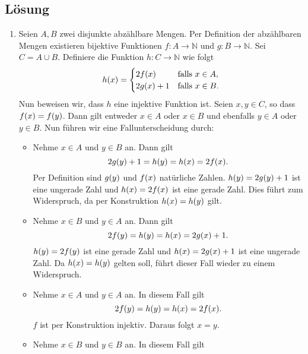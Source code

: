 \documentclass[german,12pt]{homework}
\newcommand{\NN}{\mathbb{N}}
\DeclarePairedDelimiter{\enbrace}{(}{)}
\begin{document}
    \subsection*{Lösung}
    \begin{enumerate}
        \item Seien \(A, B\) zwei disjunkte abzählbare Mengen. Per Definition
        der abzählbaren Mengen existieren bijektive Funktionen \(f: A \to \NN\)
        und \(g: B \to \NN\). Sei \(C = A \cup B\). Definiere die Funktion \(h:
        C \to \NN\) wie folgt
        \[h\enbrace*{x} = \begin{cases}
            2f\enbrace*{x} & \text{falls }x \in A,\\
            2g\enbrace*{x} + 1 & \text{falls }x \in B.
        \end{cases}\]
        Nun beweisen wir, dass \(h\) eine injektive Funktion ist. Seien \(x, y
        \in C\), so dass \(f\enbrace*{x} = f\enbrace*{y}\). Dann gilt entweder
        \(x \in A\) oder \(x \in B\) und ebenfalls \(y \in A\) oder \(y \in
        B\). Nun führen wir eine Fallunterscheidung durch:
        \begin{itemize}
            \item Nehme \(x \in A\) und \(y \in B\) an. Dann gilt
            \[2g\enbrace*{y} + 1 = h\enbrace*{y} = h\enbrace*{x} =
            2f\enbrace*{x}.\]
            Per Definition sind \(g\enbrace*{y}\) und \(f\enbrace*{x}\)
            natürliche Zahlen. \(h\enbrace*{y} = 2g\enbrace*{y} + 1\) ist eine
            ungerade Zahl und \(h\enbrace*{x} = 2f\enbrace*{x}\) ist eine
            gerade Zahl. Dies führt zum Widerspruch, da per Konstruktion
            \(h\enbrace*{x} = h\enbrace*{y}\) gilt.
            \item Nehme \(x \in B\) und \(y \in A\) an. Dann gilt
            \[2f\enbrace*{y} = h\enbrace*{y} = h\enbrace*{x} = 2g\enbrace*{x} +
            1.\]
            \(h\enbrace*{y} = 2f\enbrace*{y}\) ist eine gerade Zahl und
            \(h\enbrace*{x} = 2g\enbrace*{x} + 1\) ist eine ungerade Zahl. Da
            \(h\enbrace*{x} = h\enbrace*{y}\) gelten soll, führt dieser Fall
            wieder zu einem Widerspruch.
            \item Nehme \(x \in A\) und \(y \in A\) an. In diesem Fall gilt
            \[2f\enbrace*{y} = h\enbrace*{y} = h\enbrace*{x} = 2f\enbrace*{x}.\]
            \(f\) ist per Konstruktion injektiv. Daraus folgt \(x = y\).
            \item Nehme \(x \in B\) und \(y \in B\) an. In diesem Fall gilt

\end{itemize}
\end{enumerate}
\end{document}
